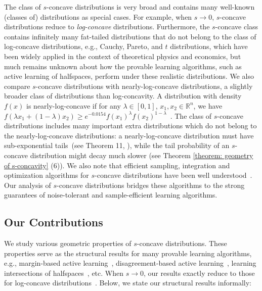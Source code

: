 \documentclass[11pt]{article}
\newcommand{\R}{\mathbb{R}}
\begin{document}
\medskip
{}
The class of $s$-concave distributions is very broad and contains many well-known (classes of) distributions as special cases. For example, when $s\rightarrow 0$, $s$-concave distributions reduce to \emph{log-concave} distributions. Furthermore, the $s$-concave class contains infinitely many fat-tailed distributions that do not belong to the class of log-concave distributions, e.g., Cauchy, Pareto, and $t$ distributions, which have been widely applied in the context of theoretical physics and economics, but much remains unknown about how the provable learning algorithms, such as active learning of halfspaces, perform under these realistic distributions.
We also compare $s$-concave distributions with nearly-log-concave distributions, a slightly broader class of distributions than log-concavity. A distribution with density $f(x)$ is nearly-log-concave if for any $\lambda\in[0,1]$, $x_1,x_2\in\R^n$, we have $f(\lambda x_1+(1-\lambda)x_2)\ge e^{-0.0154}f(x_1)^\lambda f(x_2)^{1-\lambda}$~\cite{balcan2013active}. The class of $s$-concave distributions includes many important extra distributions which do not belong to the nearly-log-concave distributions: a nearly-log-concave distribution must have sub-exponential tails~(see Theorem 11, \cite{balcan2013active}), while the tail probability of an $s$-concave distribution might decay much slower (see Theorem \ref{theorem: geometry of s-concavity} (6)).
We also note that efficient sampling, integration and optimization algorithms for $s$-concave distributions have been well understood~\cite{chandrasekaran2009sampling,kalai2006simulated}. Our analysis of $s$-concave distributions bridges these algorithms to the strong guarantees of noise-tolerant and sample-efficient learning algorithms.


\subsection{Our Contributions}

\medskip
{}
We study various geometric properties of $s$-concave distributions. These properties serve as the structural results for many provable learning algorithms, e.g., margin-based active learning~\cite{balcan2013active}, disagreement-based active learning~\cite{wang2011smoothness,hanneke2014theory}, learning intersections of halfspaces~\cite{klivans2009baum}, etc. When $s\rightarrow 0$, our results exactly reduce to those for log-concave distributions~\cite{balcan2013active,awasthi2016learning,awasthi2017power}. Below, we state our structural results informally:
\end{document}
